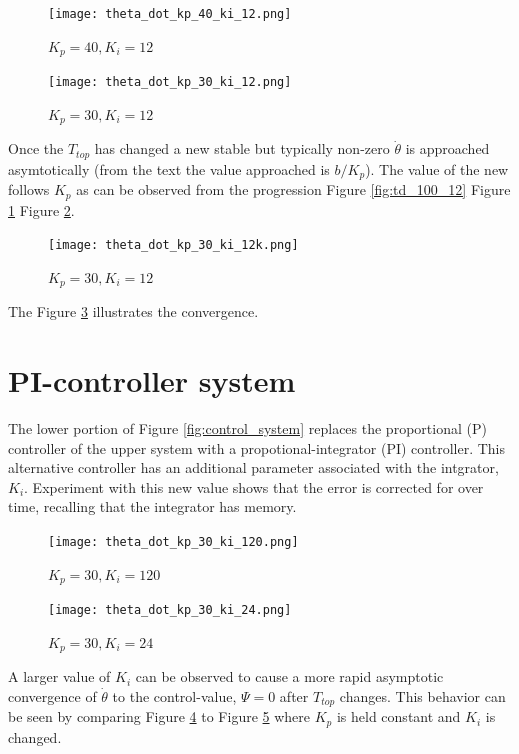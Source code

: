 \documentclass{article}
\begin{document}
\begin{figure}[h!]
\centering
\texttt{[image: theta\_dot\_kp\_40\_ki\_12.png]}
\caption{$K_p = 40, K_i = 12$}
\label{fig:td_40_12}
\end{figure}

\begin{figure}[h!]
\centering
\texttt{[image: theta\_dot\_kp\_30\_ki\_12.png]}
\caption{$K_p = 30, K_i = 12$}
\label{fig:td_30_12}
\end{figure}

Once the $T_{top}$ has changed a new stable but
typically non-zero $\dot{\theta}$ is approached asymtotically
(from the text the value approached is $b/K_p$).
The value of the new  follows $K_p$ as can be
observed from the progression Figure \ref{fig:td_100_12}
\rightarrow Figure \ref{fig:td_40_12} \rightarrow Figure \ref{fig:td_30_12}.


\begin{figure}[h!]
\centering
\texttt{[image: theta\_dot\_kp\_30\_ki\_12k.png]}
\caption{$K_p = 30, K_i = 12$}
\label{fig:td_30_1200}
\end{figure}

The Figure \ref{fig:td_30_1200} illustrates the convergence.


\section{PI-controller system}
The lower portion of Figure \ref{fig:control_system}
replaces the proportional (P) controller of the upper system
with a propotional-integrator (PI) controller.
This alternative controller has an additional parameter
associated with the intgrator, $K_i$.
Experiment with this new value shows that the
error is corrected for over time,
recalling that the integrator has memory.

\begin{figure}[h!]
\centering
\texttt{[image: theta\_dot\_kp\_30\_ki\_120.png]}
\caption{$K_p = 30, K_i = 120$}
\label{fig:td_30_120}
\end{figure}

\begin{figure}[h!]
\centering
\texttt{[image: theta\_dot\_kp\_30\_ki\_24.png]}
\caption{$K_p = 30, K_i = 24$}
\label{fig:td_30_24}
\end{figure}

A larger value of $K_i$ can be observed to cause a
more rapid asymptotic convergence of
$\dot{\theta}$ to the control-value, $\Psi = 0$
after $T_{top}$ changes.
This behavior can be seen by comparing
Figure \ref{fig:td_30_120} to Figure \ref{fig:td_30_24}
where $K_p$ is held constant and $K_i$ is changed.




\end{document}
